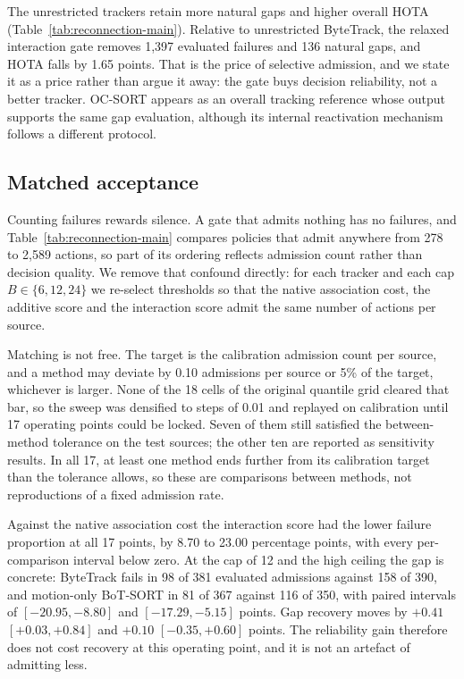 The unrestricted trackers retain more natural gaps and higher overall
HOTA (Table~\ref{tab:reconnection-main}). Relative to unrestricted
ByteTrack, the relaxed interaction gate removes 1,397 evaluated failures
and 136 natural gaps, and HOTA falls by 1.65 points. That is the price of
selective admission, and we state it as a price rather than argue it away:
the gate buys decision reliability, not a better tracker. OC-SORT
\cite{cao2023ocsort} appears as an overall tracking reference whose output
supports the same gap evaluation, although its internal reactivation
mechanism follows a different protocol.

\subsection{Matched acceptance}
\label{sec:matched}

Counting failures rewards silence. A gate that admits nothing has no
failures, and Table~\ref{tab:reconnection-main} compares policies that
admit anywhere from 278 to 2,589 actions, so part of its ordering reflects
admission count rather than decision quality. We remove that confound
directly: for each tracker and each cap $B\in\{6,12,24\}$ we re-select
thresholds so that the native association cost, the additive score and the
interaction score admit the same number of actions per source.

Matching is not free. The target is the calibration admission count per
source, and a method may deviate by 0.10 admissions per source or 5\% of
the target, whichever is larger. None of the 18 cells of the original
quantile grid cleared that bar, so the sweep was densified to steps of
0.01 and replayed on calibration until 17 operating points could be
locked. Seven of them
still satisfied the between-method tolerance on the test sources; the
other ten are reported as sensitivity results. In all 17, at least one
method ends further from its calibration target than the tolerance allows,
so these are comparisons between methods, not reproductions of a fixed
admission rate.

Against the native association cost the interaction score had the lower
failure proportion at all 17 points, by 8.70 to 23.00 percentage points,
with every per-comparison interval below zero. At the cap of 12 and the
high ceiling the gap is concrete: ByteTrack fails in 98 of 381 evaluated
admissions against 158 of 390, and motion-only BoT-SORT in 81 of 367
against 116 of 350, with paired intervals of $[-20.95,-8.80]$ and
$[-17.29,-5.15]$ points. Gap recovery moves by $+0.41$ $[+0.03,+0.84]$
and $+0.10$ $[-0.35,+0.60]$ points. The reliability gain therefore does
not cost recovery at this operating point, and it is not an artefact of
admitting less.

